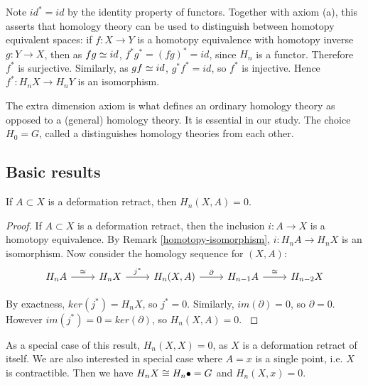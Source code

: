 \begin{remark}\label{homotopy-isomorphism}
Note $id^*=id$ by the identity property of functors. Together with axiom (a), this asserts that homology theory can be used to distinguish between homotopy equivalent spaces: if $f:X\rightarrow Y$ is a homotopy equivalence with homotopy inverse $g:Y\rightarrow X$, then as $fg\simeq id$, $f^*g^*=(fg)^*=id$, since $H_n$ is a functor. Therefore $f^*$ is surjective. Similarly, as $gf\simeq id$, $g^*f^*=id$, so $f^*$ is injective. Hence $f^*:H_nX\rightarrow H_nY$ is an isomorphism.
\end{remark}
The extra dimension axiom is what defines an ordinary homology theory as opposed to a (general) homology theory. It is essential in our study. The choice $H_0=G$, called a  distinguishes homology theories from each other.

\subsection{Basic results}
\begin{prop}
If $A\subset X$ is a deformation retract, then $H_n(X,A)=0$.
\end{prop}
\begin{proof}
If $A\subset X$ is a deformation retract, then the inclusion $i:A\rightarrow X$ is a homotopy equivalence. By Remark \ref{homotopy-isomorphism}, $i:H_nA\rightarrow H_nX$ is an isomorphism. Now consider the homology sequence for $(X,A)$:
\[\begin{tikzcd}
H_nA \arrow[r, "\iso"] & H_nX \arrow[r, "j^*"] & {H_n(X,A)} \arrow[r, "\partial"] & H_{n-1}A \arrow[r, "\iso"] & H_{n-2}X
\end{tikzcd}\]

By exactness, $ker(j^*)=H_nX$, so $j^*=0$. Similarly, $im(\partial)=0$, so $\partial=0$. However $im(j^*)=0=ker(\partial)$, so $H_n(X,A)=0$. \cite{Werndli}
\end{proof}

\begin{remark}
\label{contractible-0}
As a special case of this result, $H_n(X,X)=0$, as $X$ is a deformation retract of itself. We are also interested in special case where $A=x$ is a single point, i.e. $X$ is contractible. Then we have $H_nX\cong H_n\bullet=G$ and $H_n(X,x)=0$.
\end{remark}

